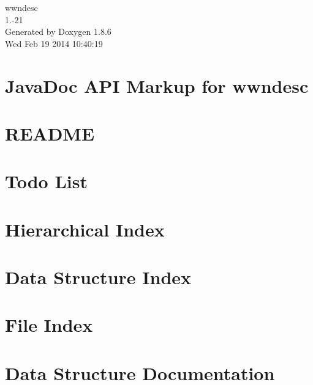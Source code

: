 \documentclass[twoside]{book}
\newcommand{\clearemptydoublepage}{%
  \newpage{\pagestyle{empty}\cleardoublepage}%
}
\begin{document}
\begin{titlepage}
\vspace*{7cm}
\begin{center}%
{\Large wwndesc \\[1ex]\large 1.-\/21 }\\
\vspace*{1cm}
{\large Generated by Doxygen 1.8.6}\\
\vspace*{0.5cm}
{\small Wed Feb 19 2014 10:40:19}\\
\end{center}
\end{titlepage}
\clearemptydoublepage
\tableofcontents
\clearemptydoublepage
{}

\chapter{Java\-Doc A\-P\-I Markup for wwndesc}
\label{index}
\chapter{R\-E\-A\-D\-M\-E}
\label{md_htdocs_README}

\chapter{Todo List}
\label{todo}

\chapter{Hierarchical Index}

\chapter{Data Structure Index}

\chapter{File Index}

\chapter{Data Structure Documentation}
















\end{document}
